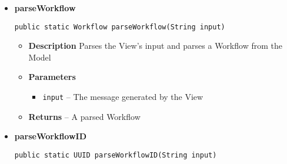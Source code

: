 \documentclass[11pt,a4paper]{report}
\begin{document}
{{{{{{{{\begin{itemize}
{						\hypertarget{studyplanning.controller.InputParser.parseUserID(java.lang.String)}{{\bf  parseUserID}\\}
						\begin{lstlisting}[frame=none]
public static UUID parseUserID(String input)
						\end{lstlisting} %
						\begin{itemize}
							\item{
								{\bf Description}
								Parses a user id
							}
							\item{
								{\bfseries Parameters}
								\begin{itemize}
									\item{\texttt{input} The message generated by the View}
								\end{itemize}
							}
							\item{
								{\bf Returns}
								-- The parsed id
								}
						\end{itemize}
					}%
					\item{ 
						\hypertarget{studyplanning.controller.InputParser.parseWorkflow(java.lang.String)}{{\bf  parseWorkflow}\\}
						\begin{lstlisting}[frame=none]
public static Workflow parseWorkflow(String input)
						\end{lstlisting} %
						\begin{itemize}
							\item{
								{\bf  Description}		
								Parses the View's input and parses a Workflow from the Model
							}
							\item{
								{\bf  Parameters}
								\begin{itemize}
									\item{
										\texttt{input} -- The message generated by the View}
								\end{itemize}
							}%
							\item{{\bf  Returns} -- 
								A parsed Workflow	
							}%
						\end{itemize}
					}%
					\item{ 
						\hypertarget{studyplanning.controller.InputParser.parseWorkflowID(java.lang.String)}{{\bf  parseWorkflowID}\\}
						\begin{lstlisting}[frame=none]
public static UUID parseWorkflowID(String input)

\end{lstlisting}}
\end{itemize}}}}}}}}}
\end{document}
